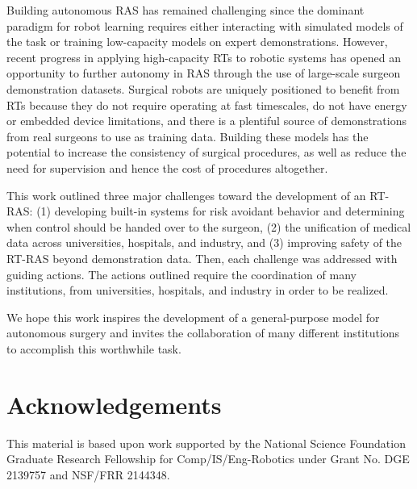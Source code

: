 \documentclass[fleqn,10pt]{wlscirep}\twocolumn
\begin{document}
Building autonomous RAS has remained challenging since the dominant paradigm for robot learning requires either interacting with simulated models of the task or training low-capacity models on expert demonstrations. However, recent progress in applying high-capacity RTs to robotic systems has opened an opportunity to further autonomy in RAS through the use of large-scale surgeon demonstration datasets. Surgical robots are uniquely positioned to benefit from RTs because they do not require operating at fast timescales, do not have energy or embedded device limitations, and there is a plentiful source of demonstrations from real surgeons to use as training data. Building these models has the potential to increase the consistency of surgical procedures, as well as reduce the need for supervision and hence the cost of procedures altogether. %

This work outlined three major challenges toward the development of an RT-RAS: (1) developing built-in systems for risk avoidant behavior and determining when control should be handed over to the surgeon, (2) the unification of medical data across universities, hospitals, and industry, and (3) improving safety of the RT-RAS beyond demonstration data. Then, each challenge was addressed with guiding actions. The actions outlined require the coordination of many institutions, from universities, hospitals, and industry in order to be realized. 

We hope this work inspires the development of a general-purpose model for autonomous surgery  and invites the collaboration of many different institutions to accomplish this worthwhile task. 


 


 \section*{Acknowledgements}

This material is based upon work supported by the National Science Foundation Graduate Research Fellowship for Comp/IS/Eng-Robotics under Grant No. DGE 2139757 and NSF/FRR 2144348.

 
\end{document}
